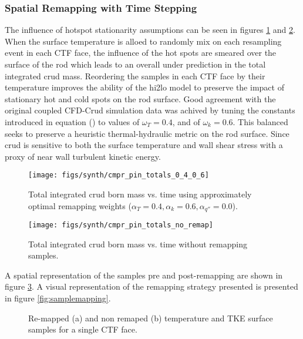 \subsubsection{Spatial Remapping with Time Stepping}

The influence of hotspot stationarity assumptions can be seen in figures \ref{fig:cmprpintotals0406} and \ref{fig:cmprpintotalsnoremap}.  When the surface temperature is alloed to randomly mix on each resampling event in each CTF face, the influence of the hot spots are smeared over the surface of the rod which leads to an overall under prediction in the total integrated crud mass.  Reordering the samples in each CTF face by their temperature improves the ability of the hi2lo model to preserve the impact of stationary hot and cold spots on the rod surface.  Good agreement with the original coupled CFD-Crud simulation data was achived by tuning the constants introduced in equation () to values of $\omega_T = 0.4$, and of $\omega_k = 0.6$.  This balanced seeks to preserve a heuristic thermal-hydraulic metric on the rod surface.  Since crud is sensitive to both the surface temperature and wall shear stress with a proxy of near wall turbulent kinetic energy.


\begin{figure}[H]
    \centering
    \texttt{[image: figs/synth/cmpr\_pin\_totals\_0\_4\_0\_6]}
    \caption[Total integrated crud born mass vs. time using approximately optimal remapping weights.]{Total integrated crud born mass vs. time using approximately optimal remapping weights ($\alpha_T=0.4, \alpha_{k}=0.6, \alpha_{q''}=0.0$).}
    \label{fig:cmprpintotals0406}
\end{figure}
\begin{figure}[H]
    \centering
    \texttt{[image: figs/synth/cmpr\_pin\_totals\_no\_remap]}
    \caption{Total integrated crud born mass vs. time without remapping samples.}
    \label{fig:cmprpintotalsnoremap}
\end{figure}

A spatial representation of the samples pre and post-remapping are shown in figure \ref{fig:remmap_comp}.  A visual representation of the remapping strategy presented is presented in figure \ref{fig:samplemapping}.

\begin{figure}[H]%
    \centering
    \qquad
    \caption[Re-mapped and non remaped temperature and TKE surface samples]{Re-mapped (a) and non remaped (b) temperature and TKE surface samples for a single CTF face.}%
    \label{fig:remmap_comp}%
\end{figure}

